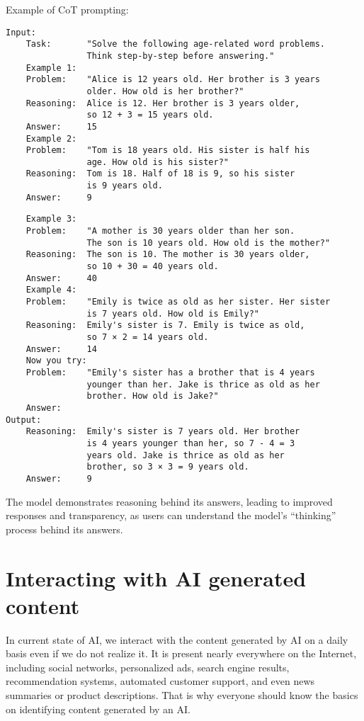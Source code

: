 Example of CoT prompting:
\begin{verbatim}
Input:
    Task:       "Solve the following age-related word problems.
                Think step-by-step before answering."
    Example 1:
    Problem:    "Alice is 12 years old. Her brother is 3 years
                older. How old is her brother?"
    Reasoning:  Alice is 12. Her brother is 3 years older, 
                so 12 + 3 = 15 years old.
    Answer:     15
    Example 2:
    Problem:    "Tom is 18 years old. His sister is half his
                age. How old is his sister?"
    Reasoning:  Tom is 18. Half of 18 is 9, so his sister 
                is 9 years old.
    Answer:     9
\end{verbatim}
\clearpage
\begin{verbatim}
    Example 3:
    Problem:    "A mother is 30 years older than her son. 
                The son is 10 years old. How old is the mother?"
    Reasoning:  The son is 10. The mother is 30 years older, 
                so 10 + 30 = 40 years old.
    Answer:     40
    Example 4:
    Problem:    "Emily is twice as old as her sister. Her sister
                is 7 years old. How old is Emily?"
    Reasoning:  Emily's sister is 7. Emily is twice as old, 
                so 7 × 2 = 14 years old.
    Answer:     14
    Now you try:
    Problem:    "Emily's sister has a brother that is 4 years 
                younger than her. Jake is thrice as old as her 
                brother. How old is Jake?"
    Answer: 
Output:
    Reasoning:  Emily's sister is 7 years old. Her brother 
                is 4 years younger than her, so 7 - 4 = 3 
                years old. Jake is thrice as old as her 
                brother, so 3 × 3 = 9 years old. 
    Answer:     9
\end{verbatim}

The model demonstrates reasoning behind its answers, leading to improved responses and transparency, as users can understand the model's ``thinking'' process behind its answers.

\section{Interacting with AI generated content}
In current state of AI, we interact with the content generated by AI on a daily basis even if we do not realize it. It is present nearly everywhere on the Internet, including social networks, personalized ads, search engine results, recommendation systems, automated customer support, and even news summaries or product descriptions. That is why everyone should know the basics on identifying content generated by an AI.


